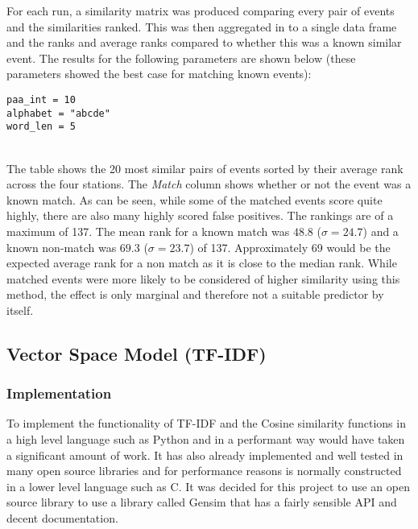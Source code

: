 \documentclass[../report.tex]{subfiles}
\begin{document}
	For each run, a similarity matrix was produced comparing every pair of events and the similarities ranked.  This was then aggregated in to a single data frame and the ranks and average ranks compared to whether this was a known similar event.  The results for the following parameters are shown below (these parameters showed the best case for matching known events):
	
\begin{verbatim}
paa_int = 10
alphabet = "abcde"
word_len = 5
\end{verbatim}

\\

	The table shows the 20 most similar pairs of events sorted by their average rank across the four stations.  The \textit{Match} column shows whether or not the event was a known match.  As can be seen, while some of the matched events score quite highly, there are also many highly scored false positives.  The rankings are of a maximum of 137.  The mean rank for a known match was $48.8$ ($\sigma = 24.7$) and a known non-match was $69.3$ ($\sigma = 23.7$) of 137.  Approximately 69 would be the expected average rank for a non match as it is close to the median rank.  While matched events were more likely to be considered of higher similarity using this method, the effect is only marginal and therefore not a suitable predictor by itself.

\subsection{Vector Space Model (TF-IDF)} \label{sec:vsm-impl}
\subsubsection{Implementation}

	To implement the functionality of TF-IDF and the Cosine similarity functions in a high level language such as Python and in a performant way would have taken a significant amount of work.  It has also already implemented and well tested in many open source libraries and for performance reasons is normally constructed in a lower level language such as C.  It was decided for this project to use an open source library to use a library called Gensim \citep{rehurek_lrec} that has a fairly sensible API and decent documentation.
	
\end{document}
